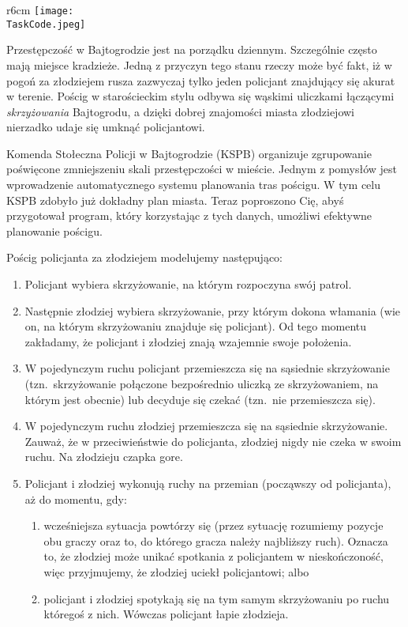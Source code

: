 \documentclass{boi2014-pl}
\renewcommand{\TaskCode}{coprobber}
\begin{document}
    \begin{wrapfigure}[8]{r}{6cm}
        \vspace{-24pt}
		\texttt{[image: \\TaskCode.jpeg]}
	\end{wrapfigure}

  \smallskip
    Przestępczość w Bajtogrodzie jest na porządku dziennym.
    Szczególnie często mają miejsce kradzieże.
    Jedną z przyczyn tego stanu rzeczy może być fakt, iż w pogoń za złodziejem
    rusza zazwyczaj tylko jeden policjant znajdujący się akurat w terenie.
    Pościg w starościeckim stylu odbywa się wąskimi uliczkami łączącymi
    \emph{skrzyżowania} Bajtogrodu, a dzięki dobrej znajomości miasta złodziejowi
    nierzadko udaje się umknąć policjantowi.

  \smallskip
    Komenda Stołeczna Policji w Bajtogrodzie (KSPB) organizuje zgrupowanie poświęcone
    zmniejszeniu skali przestępczości w mieście.
    Jednym z pomysłów jest wprowadzenie automatycznego systemu planowania tras pościgu.
    W tym celu KSPB zdobyło już dokładny plan miasta.
    Teraz poproszono Cię, abyś przygotował program, który korzystając z tych danych,
    umożliwi efektywne planowanie pościgu.

    Pościg policjanta za złodziejem modelujemy następująco:
    \begin{enumerate}
        \item Policjant wybiera skrzyżowanie, na którym rozpoczyna swój patrol.
        \item Następnie złodziej wybiera skrzyżowanie, przy którym dokona włamania
            (wie on, na którym skrzyżowaniu znajduje się policjant).
            Od tego momentu zakładamy, że policjant i złodziej znają wzajemnie
            swoje położenia.
        \item W pojedynczym ruchu policjant przemieszcza się na sąsiednie skrzyżowanie
            (tzn.\ skrzyżowanie połączone bezpośrednio uliczką ze skrzyżowaniem,
            na którym jest obecnie) lub decyduje się czekać (tzn.\ nie przemieszcza się).
        \item W pojedynczym ruchu złodziej przemieszcza się na sąsiednie skrzyżowanie.
            Zauważ, że w przeciwieństwie do policjanta, złodziej nigdy nie czeka
            w swoim ruchu.
            Na złodzieju czapka gore.
        \item Policjant i złodziej wykonują ruchy na przemian (począwszy od policjanta),
            aż do momentu, gdy:
        \begin{enumerate}
            \item wcześniejsza sytuacja powtórzy się (przez sytuację rozumiemy pozycje
                obu graczy oraz to, do którego gracza należy najbliższy ruch).
                Oznacza to, że złodziej może unikać spotkania z policjantem w nieskończoność,
                więc przyjmujemy, że złodziej uciekł policjantowi; albo
            \item policjant i złodziej spotykają się na tym samym skrzyżowaniu
                po ruchu któregoś z nich.
                Wówczas policjant łapie złodzieja.
        \end{enumerate}
    \end{enumerate}
\end{document}
